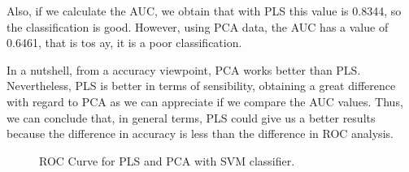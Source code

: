 Also, if we calculate the AUC, we obtain that with PLS this value is 0.8344, so the classification is good. However, using PCA data, the AUC has a value of 0.6461, that is tos ay, it is a poor classification.

In a nutshell, from a accuracy viewpoint, PCA works better than PLS. Nevertheless, PLS is better in terms of sensibility, obtaining a great difference with regard to PCA as we can appreciate if we compare the AUC values. Thus, we can conclude that, in general terms, PLS could give us a better results because the difference in accuracy is less than the difference in ROC analysis.

\begin{figure}[H]
	\centering
	\caption{ROC Curve for PLS and PCA with SVM classifier.}
	\label{fig:ROC}
\end{figure}

 
